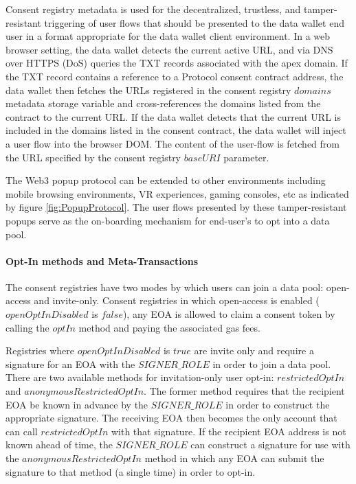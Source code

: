 Consent registry metadata is used for the decentralized, trustless, and tamper-resistant triggering of user flows that should be presented to the data wallet 
end user in a format appropriate for the data wallet client environment. In a web browser setting, the data wallet detects the current active URL, and via DNS 
over HTTPS (DoS) queries the TXT records associated with the apex domain. If the TXT record contains a reference to a Protocol consent 
contract address, the data wallet then fetches the URLs registered in the consent registry $domains$ metadata storage variable and cross-references the domains 
listed from the contract to the current URL. If the data wallet detects that the current URL is included in the domains listed in the 
consent contract, the data wallet will inject a user flow into the browser DOM. The content of the user-flow is fetched from the URL specified by the consent 
registry $baseURI$ parameter. 

The Web3 popup protocol can be extended to other environments including mobile browsing environments, VR experiences, gaming consoles, etc as indicated by 
figure \ref{fig:PopupProtocol}. The user flows presented by these tamper-resistant popups serve as the on-boarding mechanism for end-user's to opt into a data pool.

\paragraph{Opt-In methods and Meta-Transactions}
\label{section:OptInMethods}

The consent registries have two modes by which users can join a data pool: open-access and invite-only. Consent registries in which open-access is 
enabled ($openOptInDisabled$ is $false$), any EOA is allowed to claim a consent token by calling the $optIn$ method and paying the associated gas
fees. 

Registries where $openOptInDisabled$ is $true$ are invite only and require a signature for an EOA with the $SIGNER\_ROLE$ in order to join 
a data pool. There are two available methods for invitation-only user opt-in: $restrictedOptIn$ and $anonymousRestrictedOptIn$. The former method
requires that the recipient EOA be known in advance by the $SIGNER\_ROLE$ in order to construct the appropriate signature. The receiving EOA then 
becomes the only account that can call $restrictedOptIn$ with that signature. If the recipient EOA address is not known ahead of time, the $SIGNER\_ROLE$
can construct a signature for use with the $anonymousRestrictedOptIn$ method in which any EOA can submit the signature to that method (a single time) 
in order to opt-in. 


